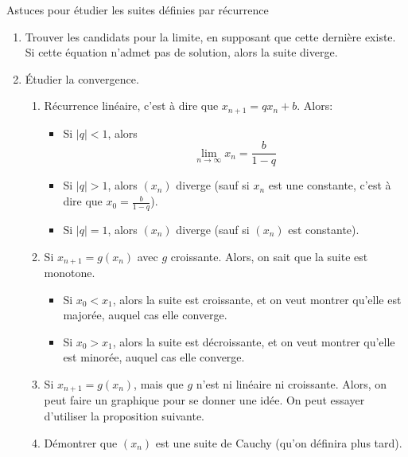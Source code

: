 \documentclass[a4paper]{article}
\begin{document}
\begin{parag}{Astuces pour étudier les suites définies par récurrence}
    \begin{enumerate}[left=0pt]
        \item Trouver les candidats pour la limite, en supposant que cette dernière existe. Si cette équation n'admet pas de solution, alors la suite diverge.
        \item Étudier la convergence.
            \begin{enumerate}
                \item Récurrence linéaire, c'est à dire que $x_{n + 1} = q x_n + b$. Alors:
                    \begin{itemize}
                        \item Si $\left|q\right| < 1$, alors
                            \[\lim_{n \to \infty} x_n = \frac{b}{1 - q}\]
                        \item Si $\left|q\right| > 1$, alors $\left(x_n\right)$ diverge (sauf si $x_n$ est une constante, c'est à dire que $x_0 = \frac{b}{1 -q}$).
                        \item Si $\left|q\right| = 1$, alors $\left(x_n\right)$ diverge (sauf si $\left(x_n\right)$ est constante).
                    \end{itemize}

                \item Si $x_{n+1} = g\left(x_n\right)$ avec $g$ croissante. Alors, on sait que la suite est monotone.
                    \begin{itemize}
                        \item Si $x_0 < x_1$, alors la suite est croissante, et on veut montrer qu'elle est majorée, auquel cas elle converge.
                        \item Si $x_0 > x_1$, alors la suite est décroissante, et on veut montrer qu'elle est minorée, auquel cas elle converge.
                    \end{itemize}

                \item Si $x_{n+1} = g\left(x_n\right)$, mais que $g$ n'est ni linéaire ni croissante. Alors, on peut faire un graphique pour se donner une idée. On peut essayer d'utiliser la proposition suivante.

                \item Démontrer que $\left(x_n\right)$ est une suite de Cauchy (qu'on définira plus tard).
            \end{enumerate}
    \end{enumerate}
\end{parag}
\end{document}
